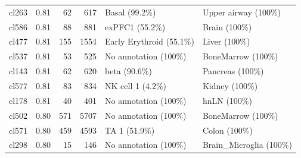 \begin{table}[ht!]
\begin{tabular}{lrrrll}
  cl263 & 0.81 &  62 & 617 & Basal (99.2\%) & Upper airway (100\%) \\ 
  cl586 & 0.81 &  88 & 881 & exPFC1 (55.2\%) & Brain (100\%) \\ 
  cl477 & 0.81 & 155 & 1554 & Early Erythroid (55.1\%) & Liver (100\%) \\ 
  cl537 & 0.81 &  53 & 525 & No annotation (100\%) & BoneMarrow (100\%) \\ 
  cl143 & 0.81 &  62 & 620 & beta (90.6\%) & Pancreas (100\%) \\ 
  cl577 & 0.81 &  83 & 834 & NK cell 1 (4.2\%) & Kidney (100\%) \\ 
  cl178 & 0.81 &  40 & 401 & No annotation (100\%) & hnLN (100\%) \\ 
  cl502 & 0.80 & 571 & 5707 & No annotation (100\%) & BoneMarrow (100\%) \\ 
  cl571 & 0.80 & 459 & 4593 & TA 1 (51.9\%) & Colon (100\%) \\ 
  cl298 & 0.80 &  15 & 146 & No annotation (100\%) & Brain\_Microglia (100\%) \\ 
   \bottomrule
\end{tabular}
\end{table}  
  
